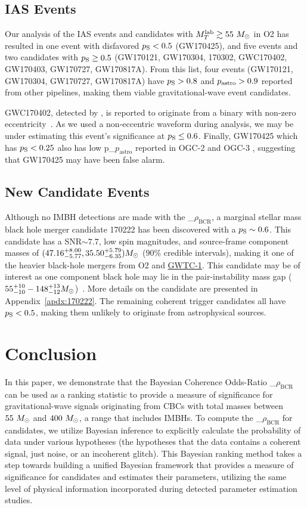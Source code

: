 \documentclass[
 nofootinbib,
 amsmath,amssymb,
 aps,
 twocolumn,
 superscriptaddress
]{revtex4-2}
\newcommand{\GWTC}{{\sc \href{https://ui.adsabs.harvard.edu/abs/2019PhRvX...9c1040A/abstract}{{GWTC-1}}}\xspace}
\newcommand{\fancytext}[1]{{\relax\ifmmode#1\else $#1$\fi}\xspace}
\newcommand{\mathcmd}[1]{{\sc \relax\ifmmode#1\else $#1$\fi}\xspace}
\newcommand{\bcr}{\mathcmd{\rho_\text{BCR}}}
\newcommand{\msun}{\mathcmd{M_\odot}}
\newcommand{\totMlab}{\mathcmd{M_T^{\rm{lab}}}}
\newcommand{\pastro}{\fancytext{p_\text{astro}}}
\newcommand{\pastrobcr}{\fancytext{p_\text{S}}}
\begin{document}
\subsection{IAS Events}
Our analysis of the IAS events and candidates with $\totMlab\gtrsim55~\msun$ in O2 has resulted in one event with disfavored $\pastrobcr<0.5$ (GW170425), and five events and two candidates with $\pastrobcr\geq0.5$ (GW170121, GW170304, 170302, GWC170402, GW170403, GW170727, GW170817A). From this list, four events (GW170121, GW170304, GW170727, GW170817A) have $\pastrobcr>0.8$ and $\pastro>0.9$ reported from other pipelines, making them viable gravitational-wave event candidates.  

GWC170402, detected by \citet{IAS2}, is reported to originate from a binary with non-zero eccentricity~\cite{IAS2}. As we used a non-eccentric waveform during analysis, we may be under estimating this event's significance at $\pastrobcr\leq0.6$. Finally, GW170425 which has $\pastrobcr<0.25$ also has low \pastro reported in OGC-2 and OGC-3 \cite{pycbc_ogc_2,pycbc_ogc_3}, suggesting that GW170425 may have been false alarm.


\subsection{New Candidate Events}
Although no IMBH detections are made with the \bcr, a marginal stellar mass black hole merger candidate 170222 has been discovered with a $\pastrobcr\sim0.6$. This candidate has a SNR$\sim7.7$, low spin magnitudes, and source-frame component masses of $({47.16}_{-5.77}^{+8.00}, {35.50}_{-6.35}^{+5.79}) \msun$ ($90\%$ credible intervals), making it one of the heavier black-hole mergers from O2 and \GWTC. This candidate may be of interest as one component black hole may lie in the pair-instability mass gap ($55^{+10}_{-10}-148^{+13}_{-12}\msun$)~\cite{Woosley:2021:arXiv, Heger:2002:ApJ}. More details on the candidate are presented in Appendix~\ref{apdx:170222}. The remaining coherent trigger candidates all have $\pastrobcr<0.5$, making them unlikely to originate from astrophysical sources. 

\section{\label{sec:Conclusion}Conclusion}

In this paper, we demonstrate that the Bayesian Coherence Odds-Ratio \bcr~\cite{BCR1} can be used as a ranking statistic to provide a measure of significance for gravitational-wave signals originating from CBCs with total masses between $55~\msun$ and $400~\msun$, a range that includes IMBHs. To compute the \bcr for candidates, we utilize Bayesian inference to explicitly calculate the probability of data under various hypotheses (the hypotheses that the data contains a coherent signal, just noise, or an incoherent glitch). This Bayesian ranking method takes a step towards building a unified Bayesian framework that provides a measure of significance for candidates and estimates their parameters, utilizing the same level of physical information incorporated during detected parameter estimation studies. 
\end{document}
